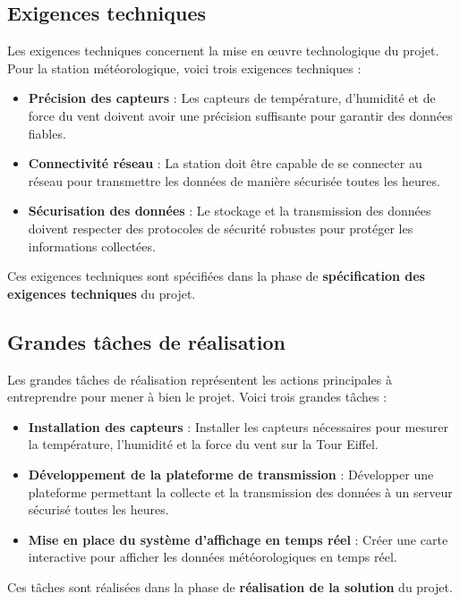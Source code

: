 \documentclass[titlepage]{article}
\begin{document}
	\subsection{Exigences techniques}
	Les exigences techniques concernent la mise en œuvre technologique du projet. Pour la station météorologique, voici trois exigences techniques :
	\begin{itemize}
		\item \textbf{Précision des capteurs} : Les capteurs de température, d'humidité et de force du vent doivent avoir une précision suffisante pour garantir des données fiables.
		\item \textbf{Connectivité réseau} : La station doit être capable de se connecter au réseau pour transmettre les données de manière sécurisée toutes les heures.
		\item \textbf{Sécurisation des données} : Le stockage et la transmission des données doivent respecter des protocoles de sécurité robustes pour protéger les informations collectées.
	\end{itemize}
	Ces exigences techniques sont spécifiées dans la phase de \textbf{spécification des exigences techniques} du projet.

	\subsection{Grandes tâches de réalisation}
	Les grandes tâches de réalisation représentent les actions principales à entreprendre pour mener à bien le projet. Voici trois grandes tâches :
	\begin{itemize}
		\item \textbf{Installation des capteurs} : Installer les capteurs nécessaires pour mesurer la température, l'humidité et la force du vent sur la Tour Eiffel.
		\item \textbf{Développement de la plateforme de transmission} : Développer une plateforme permettant la collecte et la transmission des données à un serveur sécurisé toutes les heures.
		\item \textbf{Mise en place du système d'affichage en temps réel} : Créer une carte interactive pour afficher les données météorologiques en temps réel.
	\end{itemize}
	Ces tâches sont réalisées dans la phase de \textbf{réalisation de la solution} du projet.
\end{document}
